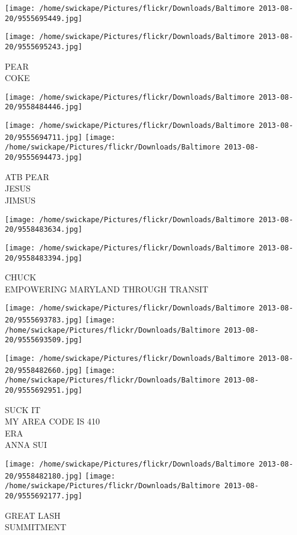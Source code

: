 \documentclass[10pt,letterpaper]{article}
\begin{document}
\texttt{[image: /home/swickape/Pictures/flickr/Downloads/Baltimore 2013-08-20/9555695449.jpg]}

\vspace{0.25in}
\texttt{[image: /home/swickape/Pictures/flickr/Downloads/Baltimore 2013-08-20/9555695243.jpg]}

PEAR\\
COKE\\
\pagebreak

\texttt{[image: /home/swickape/Pictures/flickr/Downloads/Baltimore 2013-08-20/9558484446.jpg]}

\vspace{0.25in}
\texttt{[image: /home/swickape/Pictures/flickr/Downloads/Baltimore 2013-08-20/9555694711.jpg]}
\texttt{[image: /home/swickape/Pictures/flickr/Downloads/Baltimore 2013-08-20/9555694473.jpg]}

ATB PEAR\\
JESUS\\
JIMSUS\\
\pagebreak

\texttt{[image: /home/swickape/Pictures/flickr/Downloads/Baltimore 2013-08-20/9558483634.jpg]}

\vspace{0.25in}
\texttt{[image: /home/swickape/Pictures/flickr/Downloads/Baltimore 2013-08-20/9558483394.jpg]}

CHUCK\\
EMPOWERING MARYLAND THROUGH TRANSIT\\
\pagebreak

\texttt{[image: /home/swickape/Pictures/flickr/Downloads/Baltimore 2013-08-20/9555693783.jpg]}
\texttt{[image: /home/swickape/Pictures/flickr/Downloads/Baltimore 2013-08-20/9555693509.jpg]}

\texttt{[image: /home/swickape/Pictures/flickr/Downloads/Baltimore 2013-08-20/9558482660.jpg]}
\texttt{[image: /home/swickape/Pictures/flickr/Downloads/Baltimore 2013-08-20/9555692951.jpg]}

SUCK IT\\
MY AREA CODE IS 410\\
ERA\\
ANNA SUI\\
\pagebreak

\texttt{[image: /home/swickape/Pictures/flickr/Downloads/Baltimore 2013-08-20/9558482180.jpg]}
\texttt{[image: /home/swickape/Pictures/flickr/Downloads/Baltimore 2013-08-20/9555692177.jpg]}

GREAT LASH\\
SUMMITMENT\\
\pagebreak
\end{document}

